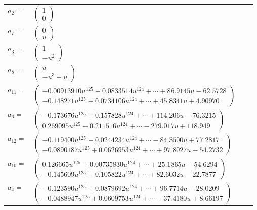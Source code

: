 \documentclass[1p]{elsarticle_modified}
\theoremstyle{definition}
\begin{document}
\begin{tabular}{m{7pt} m{180pt} m{7pt} m{180pt} }
\flushright $a_{2}=$&$\begin{pmatrix}1\\0\end{pmatrix}$ \\
\flushright $a_{7}=$&$\begin{pmatrix}0\\u\end{pmatrix}$ \\
\flushright $a_{3}=$&$\begin{pmatrix}1\\- u^2\end{pmatrix}$ \\
\flushright $a_{8}=$&$\begin{pmatrix}u\\- u^3+u\end{pmatrix}$ \\
\flushright $a_{11}=$&$\begin{pmatrix}-0.00913910 u^{125}+0.0833514 u^{124}+\cdots+86.9145 u-62.5728\\-0.148271 u^{125}+0.0734106 u^{124}+\cdots+45.8341 u+4.90970\end{pmatrix}$ \\
\flushright $a_{6}=$&$\begin{pmatrix}-0.173676 u^{125}+0.157828 u^{124}+\cdots+114.206 u-76.3215\\0.269095 u^{125}-0.211516 u^{124}+\cdots-279.017 u+118.949\end{pmatrix}$ \\
\flushright $a_{12}=$&$\begin{pmatrix}-0.119400 u^{125}-0.0244234 u^{124}+\cdots-84.3500 u+77.2817\\-0.0890187 u^{125}+0.0626953 u^{124}+\cdots+97.8027 u-54.2732\end{pmatrix}$ \\
\flushright $a_{10}=$&$\begin{pmatrix}0.126665 u^{125}+0.00735830 u^{124}+\cdots+25.1865 u-54.6294\\-0.145609 u^{125}+0.105822 u^{124}+\cdots+82.6032 u-22.7877\end{pmatrix}$ \\
\flushright $a_{4}=$&$\begin{pmatrix}-0.123590 u^{125}+0.0879692 u^{124}+\cdots+96.7714 u-28.0209\\-0.0488947 u^{125}+0.0609753 u^{124}+\cdots-37.4180 u+8.66197\end{pmatrix}$ \\

\end{tabular}
\end{document}
